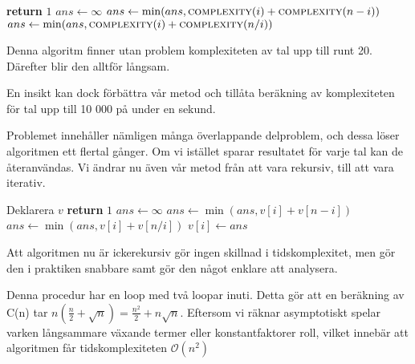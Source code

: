 \documentclass[a4paper,titlepage,draft]{article}
\begin{document}
\begin{algorithmic}[1]
\State \textbf{return} $1$
\EndIf
\State  $ans\gets \infty$
\State $ans\gets \min(ans, \textsc{complexity}(i)+\textsc{complexity}(n-i))$
\EndFor
{}
\State $ans\gets \min(ans, \textsc{complexity}(i)+\textsc{complexity}(n/i))$
\EndIf
\EndFor

\EndProcedure
\end{algorithmic}

Denna algoritm finner utan problem komplexiteten av tal upp till runt 20. Därefter blir den alltför långsam.

En insikt kan dock förbättra vår metod och tillåta beräkning av komplexiteten för tal upp till 10 000 på under en sekund.

Problemet innehåller nämligen många överlappande delproblem, och dessa löser algoritmen ett flertal gånger. Om vi istället sparar resultatet för varje
tal kan de återanvändas. Vi ändrar nu även vår metod från att vara rekursiv, till att vara iterativ.


\begin{algorithmic}[1]
\State Deklarera $v$
\State \textbf{return} $1$
\State  $ans\gets \infty$
\State $ans\gets \min(ans, v[i]+ v[n-i])$
\EndFor
{}
\State $ans\gets \min(ans, v[i]+v[n/i])$
\EndIf
\EndFor
\State $v[i] \gets ans$
\EndFor
\EndProcedure
\end{algorithmic}


Att algoritmen nu är ickerekursiv gör ingen skillnad i tidskomplexitet, men gör den i praktiken snabbare samt gör den något enklare att analysera.

Denna procedur har en loop med två loopar inuti. Detta gör att en beräkning av C(n) tar $n\left(\frac{n}{2}+\sqrt n\right) = \frac{n^2}{2} + n\sqrt n$. Eftersom vi räknar asymptotiskt spelar varken långsammare växande termer eller konstantfaktorer roll,  vilket innebär att algoritmen får tidskomplexiteten $\mathcal{O}(n^2)$

{}

\end{document}
